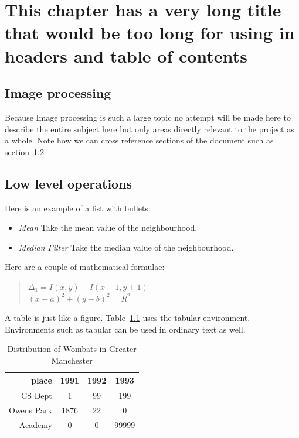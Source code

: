 \chapter[Short Chap title]{This chapter has a very long title that would be too long for using in headers and table of contents}
\section{Image processing}
Because Image processing is such a large topic no attempt will be made
here to describe the entire subject here but only areas directly
relevant to the project as a whole. Note how we can cross reference
sections of the document such as section~\ref{pg:filters}

\section{Low level operations}
\label{pg:filters}
Here is an example of a list with bullets:
\begin{itemize}
	\item{\it Mean} Take the mean value of the neighbourhood.

	\item{\it Median Filter} Take the median value of the neighbourhood.
\end{itemize}

Here are a couple of mathematical formulae:
\begin{quote}
	\centering
	$\Delta_1=I(x,y)-I(x+1,y+1)$ \\
	$(x-a)^2+(y-b)^2=R^2$
\end{quote}

A table is just like a figure. Table~\ref{wombat} uses the tabular
environment.  Environments such as tabular can be used in ordinary
text as well.
\begin{table}
	\begin{center}
		\begin{tabular}{|r|c|c|c|}\hline\hline
			place      & 1991 & 1992 & 1993  \\\hline
			CS Dept    & 1    & 99   & 199   \\
			Owens Park & 1876 & 22   & 0     \\
			Academy    & 0    & 0    & 99999 \\\hline\hline
		\end{tabular}
	\end{center}
	\caption{Distribution of Wombats in Greater Manchester}\label{wombat}
\end{table}


